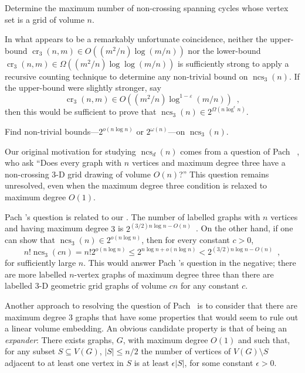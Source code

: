 \documentclass{patmorin}
\DeclareMathOperator{\crs}{cr}
\DeclareMathOperator{\ncs}{ncs}
\begin{document}
\begin{op}
  Determine the maximum number of non-crossing spanning cycles whose
  vertex set is a grid of volume $n$.
\end{op}

In what appears to be a remarkably unfortunate coincidence, neither the
upper-bound $\crs_3(n,m)\in O((m^2/n)\log (m/n))$ nor the lower-bound
$\crs_3(n,m)\in \Omega((m^2/n)\log\log(m/n))$ is sufficiently strong
to apply a recursive counting technique to determine any non-trivial
bound on $\ncs_3(n)$.  If the upper-bound were slightly stronger, say
\[
   \crs_3(n,m)\in O((m^2/n)\log^{1-\varepsilon}(m/n)) \enspace ,
\]
then this would be sufficient to prove that
$\ncs_3(n)\in2^{\Omega(n\log^{\epsilon} n)}$.

\begin{op}
  Find non-trivial bounds---$2^{o(n\log n)}$ or $2^{\omega(n)}$---on
  $\ncs_3(n)$.
\end{op}

Our original motivation for studying $\ncs_d(n)$  comes from a question
of Pach \etal~\cite{pach.thiele.ea:three-dimensional}, who ask ``Does
every graph with $n$ vertices and maximum degree three have a non-crossing
3-D grid drawing of volume $O(n)$?''  This question remains unresolved,
even when the maximum degree three condition is relaxed to maximum
degree $O(1)$.

Pach \etal's question is related to our .
The number of labelled graphs with $n$
vertices and having maximum degree $3$ is $2^{(3/2)n\log n -
O(n)}$~\cite[Appendix~A]{barat.matousek.ea:bounded-degree}. On the other
hand, if one can show that $\ncs_3(n)\in 2^{o(n\log n)}$, then for every
constant $c>0$,
\[
   n!\ncs_3(cn) = n!2^{o(n\log n)} \le 2^{n\log n + o(n\log n)}
   < 2^{(3/2)n\log n - O(n)} \enspace ,
\]
for sufficiently large $n$. This would answer Pach \etal's question in
the negative; there are more labelled $n$-vertex graphs of maximum degree
three than there are labelled 3-D geometric grid graphs of volume $cn$
for any constant $c$. 

Another approach to resolving the question of Pach \etal\ is to consider
that there are maximum degree 3 graphs that have some properties that
would seem to rule out a linear volume embedding.  An obvious candidate
property is that of being an \emph{expander}: There exists graphs, $G$,
with maximum degree $O(1)$ and such that, for any subset $S\subseteq
V(G)$, $|S|\le n/2$ the number of vertices of $V(G)\setminus S$ adjacent
to at least one vertex in $S$ is at least $\epsilon|S|$, for some constant
$\epsilon > 0$.
\end{document}
